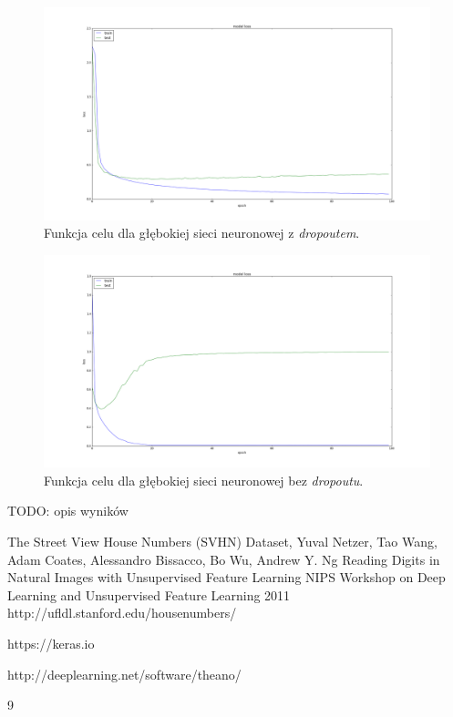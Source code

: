 \documentclass[12pt]{article}
\begin{document}
\begin{figure}[!h]
\centering
\includegraphics[scale=0.25]{loss_dropout}
\caption{Funkcja celu dla głębokiej sieci neuronowej z \textit{dropoutem}.}
\end{figure}

\begin{figure}[!h]
\centering
\includegraphics[scale=0.25]{loss_no_dropout}
\caption{Funkcja celu dla głębokiej sieci neuronowej bez \textit{dropoutu}.}
\end{figure}

TODO: opis wyników

\begin{thebibliography}{9}

The Street View House Numbers (SVHN) Dataset,
Yuval Netzer, Tao Wang, Adam Coates, Alessandro Bissacco, Bo Wu, Andrew Y. Ng
Reading Digits in Natural Images with Unsupervised Feature Learning NIPS Workshop on Deep Learning and Unsupervised Feature Learning
2011
http://ufldl.stanford.edu/housenumbers/

https://keras.io

http://deeplearning.net/software/theano/
\end{thebibliography}{9}
\end{document}

